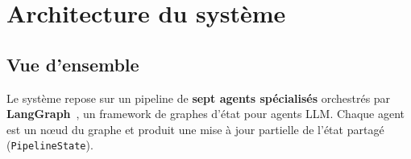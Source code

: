 \documentclass[12pt, a4paper]{article}
\begin{document}
\section{Architecture du système}

\subsection{Vue d'ensemble}

Le système repose sur un pipeline de \textbf{sept agents spécialisés} orchestrés
par \textbf{LangGraph}~\cite{langgraph2024}, un framework de graphes d'état pour
agents LLM. Chaque agent est un n\oe{}ud du graphe et produit une mise à jour
partielle de l'état partagé (\texttt{PipelineState}).
\end{document}
